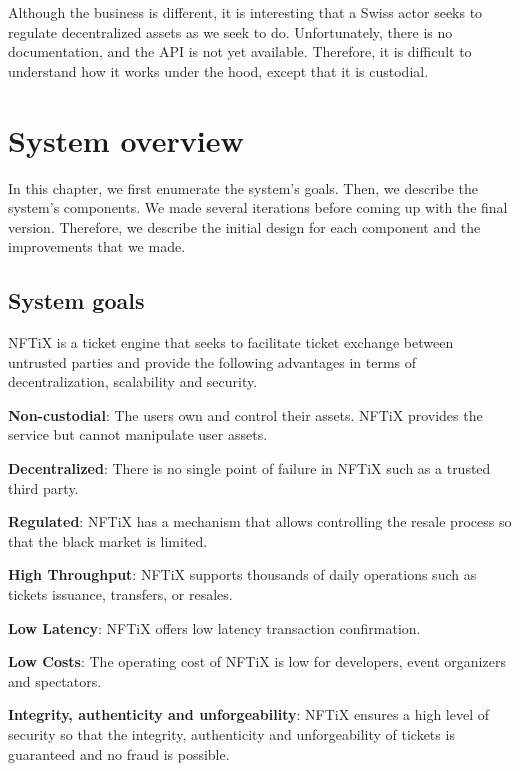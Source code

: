 \documentclass[a4paper,11pt,oneside]{report}
\begin{document}
Although the business is different, it is interesting that a Swiss actor seeks to regulate decentralized assets as we seek to do. Unfortunately, there is no documentation, and the API is not yet available. Therefore, it is difficult to understand how it works under the hood, except that it is custodial.

\chapter{System overview}
In this chapter, we first enumerate the system's goals. Then, we describe the system's components. We made several iterations before coming up with the final version. Therefore, we describe the initial design for each component and the improvements that we made.

\section{System goals}
NFTiX is a ticket engine that seeks to facilitate ticket exchange between untrusted parties and provide the following advantages in terms of decentralization, scalability and security.

\begin{description}
  \item \textbf{Non-custodial}: The users own and control their assets. NFTiX provides the service but cannot manipulate user assets.
  \item \textbf{Decentralized}: There is no single point of failure in NFTiX such as a trusted third party.
  \item \textbf{Regulated}: NFTiX has a mechanism that allows controlling the resale process so that the black market is limited.
  \item \textbf{High Throughput}: NFTiX supports thousands of daily operations such as tickets issuance, transfers, or resales.
  \item \textbf{Low Latency}: NFTiX offers low latency transaction confirmation.
  \item \textbf{Low Costs}: The operating cost of NFTiX is low for developers, event organizers and spectators.
  \item \textbf{Integrity, authenticity and unforgeability}: NFTiX ensures a high level of security so that the integrity, authenticity and unforgeability of tickets is guaranteed and no fraud is possible.
\end{description}
\end{document}
